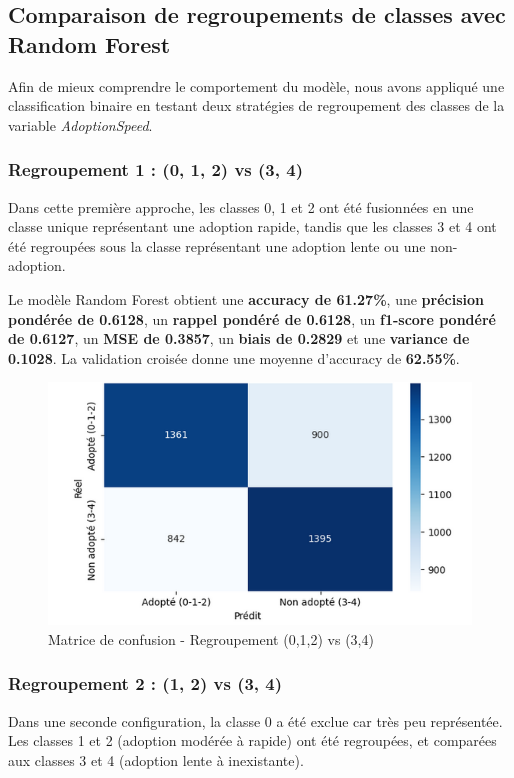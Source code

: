 \documentclass[a4paper,12pt]{article}
\begin{document}
\subsection{Comparaison de regroupements de classes avec Random Forest}

Afin de mieux comprendre le comportement du modèle, nous avons appliqué une classification binaire en testant deux stratégies de regroupement des classes de la variable \textit{AdoptionSpeed}.

\subsubsection*{Regroupement 1 : (0, 1, 2) vs (3, 4)}

Dans cette première approche, les classes 0, 1 et 2 ont été fusionnées en une classe unique représentant une adoption rapide, tandis que les classes 3 et 4 ont été regroupées sous la classe représentant une adoption lente ou une non-adoption.

Le modèle Random Forest obtient une \textbf{accuracy de 61.27\%}, une \textbf{précision pondérée de 0.6128}, un \textbf{rappel pondéré de 0.6128}, un \textbf{f1-score pondéré de 0.6127}, un \textbf{MSE de 0.3857}, un \textbf{biais de 0.2829} et une \textbf{variance de 0.1028}. La validation croisée donne une moyenne d’accuracy de \textbf{62.55\%}.

\begin{figure}[H]
    \centering
    \includegraphics[width=0.7\linewidth]{matrice1.png}
    \caption{Matrice de confusion - Regroupement (0,1,2) vs (3,4)}
    \label{fig:rf_confusion_groupe012}
\end{figure}

\subsubsection*{Regroupement 2 : (1, 2) vs (3, 4)}

Dans une seconde configuration, la classe 0 a été exclue car très peu représentée. Les classes 1 et 2 (adoption modérée à rapide) ont été regroupées, et comparées aux classes 3 et 4 (adoption lente à inexistante).
\end{document}

